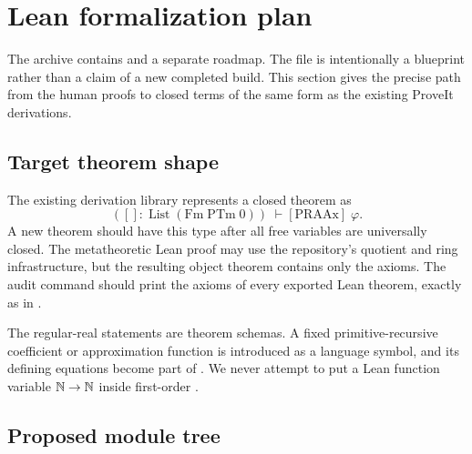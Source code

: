 \section{Lean formalization plan}\label{sec:lean}

The archive contains  and a separate
roadmap.  The file is intentionally a blueprint rather than a claim of a new
completed build.  This section gives the precise path from the human proofs to
closed terms of the same form as the existing ProveIt derivations.

\subsection{Target theorem shape}

The existing derivation library represents a closed \ipra{} theorem as
\[
 ([]:\operatorname{List}(\mathrm{Fm}\;\mathrm{PTm}\;0))
 \;\vdash[\mathrm{PRAAx}]\;\varphi.
\]
A new theorem should have this type after all free variables are universally
closed.  The metatheoretic Lean proof may use the repository's quotient and
ring infrastructure, but the resulting object theorem contains only the
\ipra{} axioms.  The audit command should print the axioms of every exported
Lean theorem, exactly as in .

The regular-real statements are theorem schemas.  A fixed primitive-recursive
coefficient or approximation function is introduced as a language symbol, and
its defining equations become part of .  We never attempt to put a
Lean function variable \(\mathbb N\to\mathbb N\) inside first-order \ipra.

\subsection{Proposed module tree}

